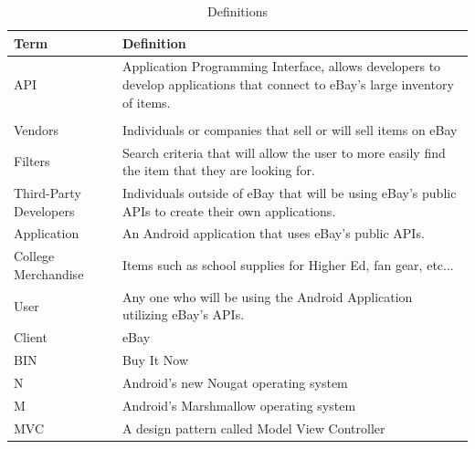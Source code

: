 \documentclass[journal,compsoc, 10pt, draftclsnofoot, onecolumn]{IEEEtran}
\begin{document}
\begin{table}[!h]
\centering
\caption{Definitions}
\label{my-label}
\begin{tabularx}{\textwidth}{l|X}
\hline
\textbf{Term}               & \textbf{Definition}                                                                                                           \\ \hline
API                    	      & Application Programming Interface, allows developers to develop applications that connect to eBay's large inventory of items. \\ \hline                                                           \\ \hline
Vendors               	      & Individuals or companies that sell or will sell items on eBay                                                                 \\ \hline
Filters                	      & Search criteria that will allow the user to more easily find the item that they are looking for.                              \\ \hline
Third-Party Developers & Individuals outside of eBay that will be using eBay's public APIs to create their own applications.                           \\ \hline
Application            	      & An Android application that uses eBay's public APIs.                                                                          \\ \hline
College Merchandise     & Items such as school supplies for Higher Ed, fan gear, etc...                                                                 \\ \hline
User                   	      & Any one who will be using the Android Application utilizing eBay's APIs.                                                      \\ \hline
Client                 	      & eBay                                                                                                                          \\ \hline
BIN                    	      & Buy It Now                                                                                                                    \\ \hline
N                   	      & Android's new Nougat operating system 
\\ \hline
M                   	      & Android's Marshmallow operating system                                                                                                                   
\\ \hline
MVC                   	      & A design pattern called Model View Controller
\\ \hline
\end{tabularx}
\end{table}
\FloatBarrier
\end{document}
